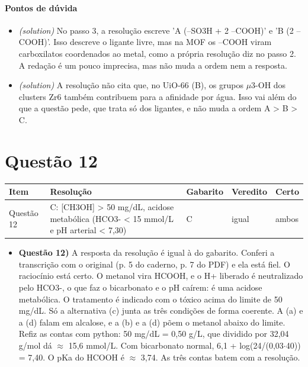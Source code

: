 \documentclass{article}%
\begin{document}
\paragraph{Pontos de dúvida}%
\begin{itemize}%
\item%
\textit{(solution)} No passo 3, a resolução escreve 'A (--SO3H + 2 --COOH)' e 'B (2 --COOH)'. Isso descreve o ligante livre, mas na MOF os --COOH viram carboxilatos coordenados ao metal, como a própria resolução diz no passo 2. A redação é um pouco imprecisa, mas não muda a ordem nem a resposta.%
\item%
\textit{(solution)} A resolução não cita que, no UiO{-}66 (B), os grupos $\mu$3{-}OH dos clusters Zr6 também contribuem para a afinidade por água. Isso vai além do que a questão pede, que trata só dos ligantes, e não muda a ordem A > B > C.%
\end{itemize}%
\section*{Questão 12}%
\begin{longtable}{@{}p{} p{} p{} p{} p{}@{}}\toprule Item & Resolução & Gabarito & Veredito & Certo \\ \midrule
Questão 12 & C: {[}CH3OH{]} > 50 mg/dL, acidose metabólica (HCO3{-} < 15 mmol/L e pH arterial < 7,30) & C & igual & ambos \\
\bottomrule\end{longtable}%
\begin{itemize}%
\item%
\textbf{Questão 12)} A resposta da resolução é igual à do gabarito. Conferi a transcrição com o original (p. 5 do caderno, p. 7 do PDF) e ela está fiel. O raciocínio está certo. O metanol vira HCOOH, e o H+ liberado é neutralizado pelo HCO3{-}, o que faz o bicarbonato e o pH caírem: é uma acidose metabólica. O tratamento é indicado com o tóxico acima do limite de 50 mg/dL. Só a alternativa (c) junta as três condições de forma coerente. A (a) e a (d) falam em alcalose, e a (b) e a (d) põem o metanol abaixo do limite. Refiz as contas com python: 50 mg/dL = 0,50 g/L, que dividido por 32,04 g/mol dá $\approx$ 15,6 mmol/L. Com bicarbonato normal, 6,1 + log(24/(0,03$\cdot$40)) = 7,40. O pKa do HCOOH é $\approx$ 3,74. As três contas batem com a resolução.%
\end{itemize}%
\end{document}
